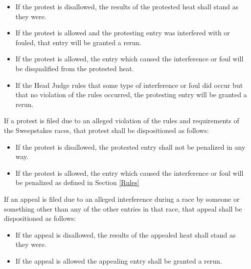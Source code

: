 	\begin{itemize}

		\item
		If the protest is disallowed, the results of the protested heat shall stand as they were.

		\item
		If the protest is allowed and the protesting entry was interfered with or fouled, that entry will be granted a rerun.

		\item
		If the protest is allowed, the entry which caused the interference or foul will be disqualified from the protested heat.

		\item
		If the Head Judge rules that some type of interference or foul did occur but that no violation of the rules occurred, the protesting entry will be granted a rerun.

	\end{itemize}

	\noindent If a protest is filed due to an alleged violation of the rules and requirements of the Sweepstakes races, that protest shall be dispositioned as follows:

	\begin{itemize}

		\item
		If the protest is disallowed, the protested entry shall not be penalized in any way.

		\item
		If the protest is allowed, the entry which caused the interference or foul will be penalized as defined in Section \ref{Rules}


	\end{itemize}

	\noindent If an appeal is filed due to an alleged interference during a race by someone or something other than any of the other entries in that race, that appeal shall be dispositioned as follows:

	\begin{itemize}

		\item
		If the appeal is disallowed, the results of the appealed heat shall stand as they were.

		\item
		If the appeal is allowed the appealing entry shall be granted a rerun.

	\end{itemize}


